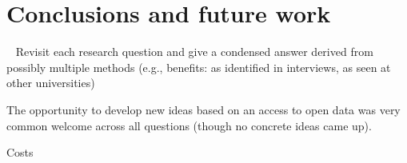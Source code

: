 \section{Conclusions and future work}~\label{section:conclusion}
Revisit each research question and give a condensed answer derived from possibly multiple methods (e.g., benefits: as identified in interviews, as seen at other universities)


The opportunity to develop new ideas based on an access to open data was very common welcome across all questions (though no concrete ideas came up). 

Costs